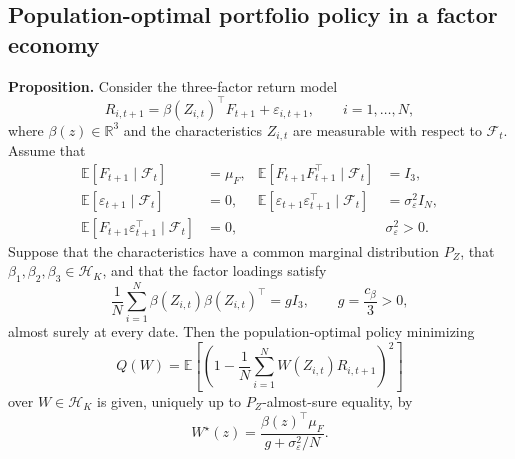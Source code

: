 \subsection*{Population-optimal portfolio policy in a factor economy}

\noindent\textbf{Proposition.}
Consider the three-factor return model
\[
R_{i,t+1}=\beta(Z_{i,t})^\top F_{t+1}+\varepsilon_{i,t+1},\qquad i=1,\ldots,N,
\]
where $\beta(z)\in\mathbb R^3$ and the characteristics $Z_{i,t}$ are measurable with respect to $\mathcal F_t$. Assume that
\[
\begin{aligned}
\mathbb E[F_{t+1}\mid\mathcal F_t]&=\mu_F,
&\mathbb E[F_{t+1}F_{t+1}^\top\mid\mathcal F_t]&=I_3,\\
\mathbb E[\varepsilon_{t+1}\mid\mathcal F_t]&=0,
&\mathbb E[\varepsilon_{t+1}\varepsilon_{t+1}^\top\mid\mathcal F_t]&=\sigma_\varepsilon^2I_N,\\
\mathbb E[F_{t+1}\varepsilon_{t+1}^\top\mid\mathcal F_t]&=0,
&&\sigma_\varepsilon^2>0.
\end{aligned}
\]
Suppose that the characteristics have a common marginal distribution $P_Z$, that $\beta_1,\beta_2,\beta_3\in\mathcal H_K$, and that the factor loadings satisfy
\[
\frac1N\sum_{i=1}^N\beta(Z_{i,t})\beta(Z_{i,t})^\top=gI_3,\qquad g=\frac{c_\beta}{3}>0,
\]
almost surely at every date. Then the population-optimal policy minimizing
\[
Q(W)=\mathbb E\left[\left(1-\frac1N\sum_{i=1}^NW(Z_{i,t})R_{i,t+1}\right)^2\right]
\]
over $W\in\mathcal H_K$ is given, uniquely up to $P_Z$-almost-sure equality, by
\[
W^\star(z)=\frac{\beta(z)^\top\mu_F}{g+\sigma_\varepsilon^2/N}.
\]

